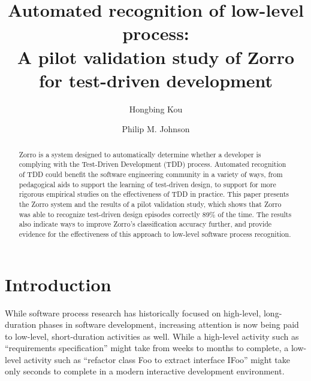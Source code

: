 \documentclass[runningheads]{llncs}
\begin{document}
\pagestyle{headings}
\mainmatter

\title{Automated recognition of low-level process: \\
A pilot validation study of Zorro for test-driven development}


\author{
Hongbing Kou \and Philip M. Johnson}


\maketitle

\begin{abstract}  %
Zorro is a system designed to automatically determine whether a developer
is complying with the Test-Driven Development (TDD) process.  Automated
recognition of TDD could benefit the software engineering community in a
variety of ways, from pedagogical aids to support the learning of
test-driven design, to support for more rigorous empirical studies on the
effectiveness of TDD in practice.  This paper presents the Zorro system and
the results of a pilot validation study, which shows that Zorro was able to
recognize test-driven design episodes correctly 89\% of the time. The
results also indicate ways to improve Zorro's classification accuracy
further, and provide evidence for the effectiveness of this approach to
low-level software process recognition.
\end{abstract}

\section{Introduction}
\label{sec:intro}

While software process research has historically focused on high-level,
long-duration phases in software development, increasing attention is now
being paid to low-level, short-duration activities as well.  While a
high-level activity such as ``requirements specification'' might take from
weeks to months to complete, a low-level activity such as ``refactor class
Foo to extract interface IFoo'' might take only seconds to complete in a
modern interactive development environment.
\end{document}
